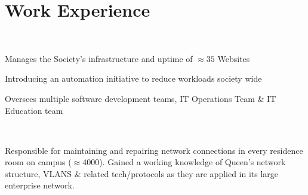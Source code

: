 \documentclass[]{hieudo-build}
\begin{document}
\begin{minipage}[t]{0.69\textwidth}


\section{Work Experience}

 \\
\begin{tightemize} 
\item Manages the Society's infrastructure and uptime of $\approx 35$ Websites
\item Introducing an automation initiative to reduce workloads society wide
\item Oversees multiple software development teams, IT Operations Team \& IT Education team
\end{tightemize}
\sectionsep

\\
\begin{tightemize}
\item Responsible for maintaining and repairing network connections in every residence room on campus ($\approx 4000$). Gained a working knowledge of Queen's network structure, VLANS \& related tech/protocols as they are applied in its large enterprise network.
\end{tightemize}
\sectionsep


\end{minipage}
\end{document}
